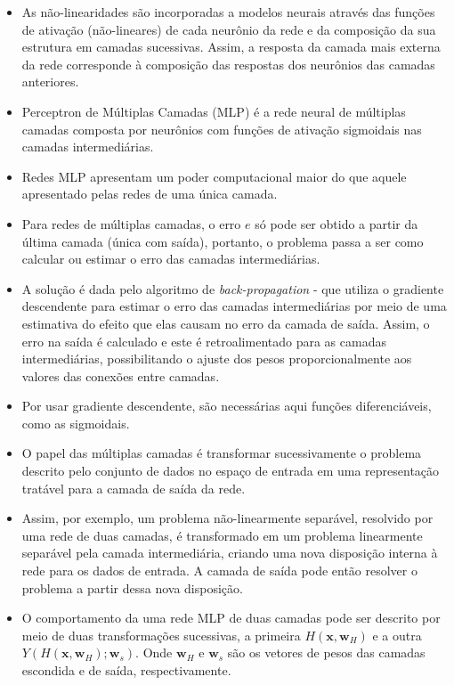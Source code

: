 \documentclass{article}
\begin{document}
	\begin{itemize}
		\item As não-linearidades são incorporadas a modelos neurais através das funções de ativação (não-lineares) de cada neurônio da rede e da composição da sua estrutura em camadas sucessivas. Assim, a resposta da camada mais externa da rede corresponde à composição das respostas dos neurônios das camadas anteriores.
		\item Perceptron de Múltiplas Camadas (MLP) é a rede neural de múltiplas camadas composta por neurônios com funções de ativação 
		sigmoidais nas camadas intermediárias.
		\item Redes MLP apresentam um poder computacional maior do que aquele apresentado pelas redes de uma única camada.
		\item Para redes de múltiplas camadas, o erro $e$ só pode ser obtido a partir da última camada (única com saída), portanto, o problema passa a ser como calcular ou estimar o erro das camadas intermediárias.
		\item A solução é dada pelo algoritmo de \textit{back-propagation} - que utiliza o gradiente descendente para estimar o erro das camadas intermediárias por meio de uma estimativa do efeito que elas causam no erro da camada de saída. Assim, o erro na saída é calculado e este é retroalimentado para as camadas intermediárias, possibilitando o ajuste dos pesos proporcionalmente aos valores das conexões entre camadas.
		\item Por usar gradiente descendente, são necessárias aqui funções diferenciáveis, como as sigmoidais.
		\item O papel das múltiplas camadas é transformar sucessivamente o problema descrito pelo conjunto de dados no espaço de entrada em uma representação tratável para a camada de saída da rede. 
		\item Assim, por exemplo, um problema não-linearmente separável, resolvido por uma rede de duas camadas, é transformado em um problema linearmente separável pela camada intermediária, criando uma nova disposição interna à rede para os dados de entrada. A camada de saída pode então resolver o problema a partir dessa nova disposição.
		\item O comportamento da uma rede MLP de duas camadas pode ser descrito por meio de duas transformações sucessivas, a primeira $H(\mathbf{x}, \mathbf{w}_H)$ e a outra $Y(H(\mathbf{x}, \mathbf{w}_H); \mathbf{w}_s)$. Onde $\mathbf{w}_H$ e $\mathbf{w}_s$ são os vetores de pesos das camadas escondida e de saída, respectivamente.

\end{itemize}
\end{document}
